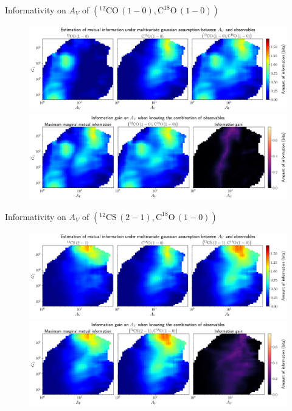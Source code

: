 \documentclass{beamer}
\begin{document}
\begin{frame}{Informativity on $A_V$ of $\left(\mathrm{^{12}CO\,(1-0)},\mathrm{C^{18}O\,(1-0)}\right)$}
    \begin{figure}
        \centering
        \includegraphics[width=0.95\linewidth]{../linearinfo/av__12co10_c18o10_linearinfo.png}
        \vfill
        \includegraphics[width=0.95\linewidth]{../linearinfo/av__12co10_c18o10_linearinfo_gain.png}
    \end{figure}
\end{frame}

\begin{frame}{Informativity on $A_V$ of $\left(\mathrm{^{12}CS\,(2-1)},\mathrm{C^{18}O\,(1-0)}\right)$}
    \begin{figure}
        \centering
        \includegraphics[width=0.95\linewidth]{../linearinfo/av__12cs21_c18o10_linearinfo.png}
        \vfill
        \includegraphics[width=0.95\linewidth]{../linearinfo/av__12cs21_c18o10_linearinfo_gain.png}
    \end{figure}
\end{frame}
\end{document}
